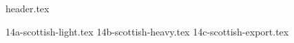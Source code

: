\clearpage
{}
\divisorLine
{header.tex}
\begin{multicols}{2}
{14a-scottish-light.tex}
{14b-scottish-heavy.tex}
{14c-scottish-export.tex}
\end{multicols}